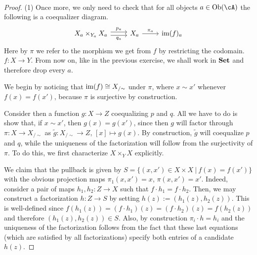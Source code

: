 \documentclass[a4paper,11pt,openany]{scrartcl}
\begin{document}
~\\
\begin{proof}
    (1) Once more, we only need to check that for all objects $a\in\Ob(\cA)$ the
    following is a coequalizer diagram.
    \[\begin{tikzcd}
	{X_a\times_{Y_a}X_a} & {X_a} & {\im(f)_a}
	\arrow["{p_a}", from=1-1, to=1-2, shift left=1]
	\arrow["{q_a}"', from=1-1, to=1-2, shift right=1]
	\arrow["{\pi_a}"', from=1-2, to=1-3, swap]
    \end{tikzcd}\]
    Here by $\pi$ we refer to the morphism we get from $f$ by restricting the
    codomain. $f\colon X\rightarrow Y$. From now on, like in the previous
    exercise, we shall work in $\operatorname{\mathbf{Set}}$ and therefore drop every $a$.

    We begin by noticing that $\operatorname{im}(f)\cong X_{/\sim}$ under $\pi$, where $x\sim x'$
    whenever $f(x)=f(x')$, because $\pi$ is surjective by construction.

    Consider then a function $g\colon X\rightarrow Z$ coequalizing $p$ and $q$.
    All we have to do is show that, if $x\sim x'$, then $g(x)=g(x')$, since then
    $g$ will factor through $\pi\colon X\rightarrow X_{/\sim}$ as
    $\tilde{g}\colon X_{/\sim}\rightarrow Z$, $[x]\mapsto g(x)$. By construction,
    $\tilde{g}$ will coequalize $p$ and $q$, while the uniqueness of the
    factorization will follow from the surjectivity of $\pi$. To do this, we
    first characterize $X\times_YX$ explicitly.

    We claim that the pullback is given by $S=\{(x,x')\in X\times X\ |\
    f(x)=f(x')\}$ with the obvious projection maps $\pi_1(x,x')=x$,
    $\pi(x,x')=x'$. Indeed, consider a pair of maps $h_1,h_2\colon Z\rightarrow
    X$ such that $f\cdot h_1=f\cdot h_2$. Then, we may construct a factorization
    $h\colon Z\rightarrow S$ by setting $h(z):=(h_1(z),h_2(z))$. This is
    well-defined since $f(h_1(z))=(f\cdot h_1)(z)=(f\cdot h_2)(z)=f(h_2(z))$ and
    therefore $(h_1(z),h_2(z))\in S$. Also, by construction $\pi_i\cdot h=h_i$
    and the uniqueness of the factorization follows from the fact that these
    last equations (which are satisfied by all factorizations) specify both
    entries of a candidate $h(z)$.


\end{proof}
\end{document}
